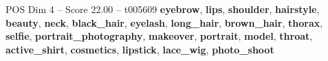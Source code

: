 \begin{textsample}{POS Dim 4 – Score 22.00 – t005609}  \label{ex:f4_pos_015}
\textbf{eyebrow}, \textbf{lips}, \textbf{shoulder}, \textbf{hairstyle}, \textbf{beauty}, \textbf{neck}, \textbf{black\_hair}, \textbf{eyelash}, \textbf{long\_hair}, \textbf{brown\_hair}, \textbf{thorax}, \textbf{selfie}, \textbf{portrait\_photography}, \textbf{makeover}, \textbf{portrait}, \textbf{model}, \textbf{throat}, \textbf{active\_shirt}, \textbf{cosmetics}, \textbf{lipstick}, \textbf{lace\_wig}, \textbf{photo\_shoot}

\end{textsample}
